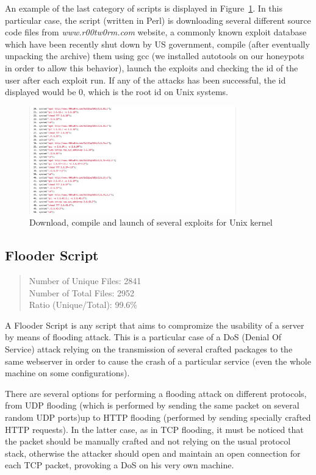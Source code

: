 An example of the last category of scripts is displayed in Figure~\ref{fig:localExploit}. In this particular case, the script (written in Perl) is downloading several different source code files from \emph{www.r00tw0rm.com} website, a commonly known exploit database which have been recently shut down by US government, compile (after eventually unpacking the archive) them using gcc (we installed autotools on our honeypots in order to allow this behavior), launch the exploits and checking the id of the user after each exploit run. If any of the attacks has been successful, the id displayed would be 0, which is the root id on Unix systems.

\begin{figure}[H]
\centerline{\includegraphics[width=0.8\textwidth]{Images/localExploit.jpg}}
\caption{Download, compile and launch of several exploits for Unix kernel\label{fig:localExploit}}
\end{figure}

\subsection{Flooder Script}

\begin{quote}
Number of Unique Files: 2841\\
Number of Total Files: 2952\\
Ratio (Unique/Total): 99.6\%
\end{quote}

A Flooder Script is any script that aims to compromize the usability of a server by means of flooding attack. This is a particular case of a DoS (Denial Of Service) attack relying on the transmission of several crafted packages to the same webserver in order to cause the crash of a particular service (even the whole machine on some configurations).

There are several options for performing a flooding attack on different protocols, from UDP flooding (which is performed by sending the same packet on several random UDP ports)up to HTTP flooding (performed by sending specially crafted HTTP requests). In the latter case, as in TCP flooding, it must be noticed that the packet should be manually crafted and not relying on the usual protocol stack, otherwise the attacker should open and maintain an open connection for each TCP packet, provoking a DoS on his very own machine.

